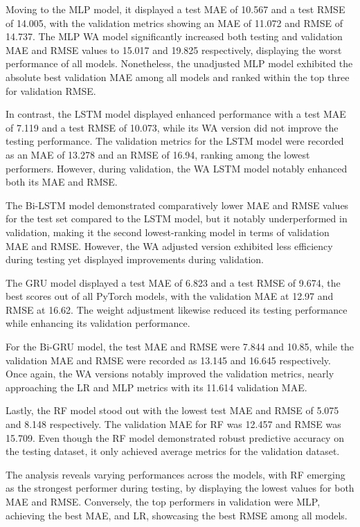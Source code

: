 Moving to the MLP model, it displayed a test MAE of 10.567 and a test RMSE of 14.005, with the validation metrics showing an MAE of 11.072 and RMSE of 14.737.
The MLP WA model significantly increased both testing and validation MAE and RMSE values to 15.017 and 19.825 respectively, displaying the worst performance of all models.
Nonetheless, the unadjusted MLP model exhibited the absolute best validation MAE among all models and ranked within the top three for validation RMSE\@.

\newpage
In contrast, the LSTM model displayed enhanced performance with a test MAE of 7.119 and a test RMSE of 10.073, while its WA version did not improve the testing performance.
The validation metrics for the LSTM model were recorded as an MAE of 13.278 and an RMSE of 16.94, ranking among the lowest performers.
However, during validation, the WA LSTM model notably enhanced both its MAE and RMSE\@.

The Bi-LSTM model demonstrated comparatively lower MAE and RMSE values for the test set compared to the LSTM model, but it notably underperformed in validation, making it the second lowest-ranking model in terms of validation MAE and RMSE\@.
However, the WA adjusted version exhibited less efficiency during testing yet displayed improvements during validation.

The GRU model displayed a test MAE of 6.823 and a test RMSE of 9.674, the best scores out of all PyTorch models, with the validation MAE at 12.97 and RMSE at 16.62.
The weight adjustment likewise reduced its testing performance while enhancing its validation performance.

For the Bi-GRU model, the test MAE and RMSE were 7.844 and 10.85, while the validation MAE and RMSE were recorded as 13.145 and 16.645 respectively.
Once again, the WA versions notably improved the validation metrics, nearly approaching the LR and MLP metrics with its 11.614 validation MAE\@.

Lastly, the RF model stood out with the lowest test MAE and RMSE of 5.075 and 8.148 respectively.
The validation MAE for RF was 12.457 and RMSE was 15.709.
Even though the RF model demonstrated robust predictive accuracy on the testing dataset, it only achieved average metrics for the validation dataset.

The analysis reveals varying performances across the models, with RF emerging as the strongest performer during testing, by displaying the lowest values for both MAE and RMSE\@.
Conversely, the top performers in validation were MLP, achieving the best MAE, and LR, showcasing the best RMSE among all models.

